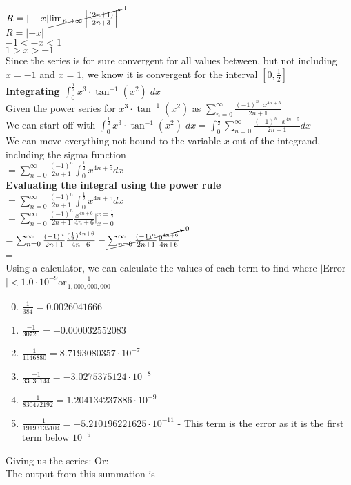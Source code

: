 \documentclass{article}
\begin{document}
\\[0.05in]$R=|-x| \cancelto{1}{\lim_{n\to\infty} \left|\frac{(2n+1)}{2n+3}\right|}$
\\$R=|-x|$
\\$-1<-x<1$
\\$1>x>-1$ 
\\Since the series is for sure convergent for all values between, but not including  $x=-1$ and $x=1$, we know it is convergent for the interval $[0,\frac{1}{2}]$
\\[1in]
\textbf{Integrating $\int_{0}^{\frac{1}{2}}x^3\cdot \tan^{-1}(x^2)\;dx$}
\\Given the power series for $x^3\cdot \tan^{-1}(x^2)$ as $\sum_{n=0}^{\infty}\frac{(-1)^n\cdot x^{4n+5}}{2n+1}$
\\[0.1in]We can start off with $\int_{0}^{\frac{1}{2}}x^3\cdot \tan^{-1}(x^2)\;dx = \int_{0}^{\frac{1}{2}}\sum_{n=0}^{\infty}\frac{(-1)^n\cdot {x^{4n+5}}}{2n+1}dx$
\\[0.1in]We can move everything not bound to the variable $x$ out of the integrand, including the sigma function
\\[0.1in]$= \sum_{n=0}^{\infty}\frac{(-1)^n}{2n+1}\int_{0}^{\frac{1}{2}} x^{4n+5}dx$
\\[0.1in]\textbf{Evaluating the integral using the power rule}
\\[0.05in]$= \sum_{n=0}^{\infty}\frac{(-1)^n}{2n+1}\int_{0}^{\frac{1}{2}} x^{4n+5}dx$
\\[0.05in]$=\sum_{n=0}^{\infty}\frac{(-1)^n}{2n+1}\frac{x^{4n+6}}{4n+6} \bigg|_{x=0}^{x=\frac{1}{2}}$
\\[0.05in]$=\sum_{n=0}^{\infty}\frac{(-1)^n}{2n+1}\frac{(\frac{1}{2})^{4n+6}}{4n+6} -\cancelto{0}{\sum_{n=0}^{\infty}\frac{(-1)^n}{2n+1}\frac{0^{4n+6}}{4n+6}} $
\\[0.05in]=
\\[0.1in]Using a calculator, we can calculate the values of each term to find where $|$Error$| < 1.0\cdot 10^{-9} $or$ \frac{1}{1,000,000,000}$
\begin{enumerate}
    \setcounter{enumi}{-1}
    \item $\frac{1}{384} = 0.0026041666$
    \item $\frac{-1}{30720}=-0.000032552083$
    \item $\frac{1}{1146880}=8.7193080357\cdot 10^{-7}$
    \item $\frac{-1}{33030144} =-3.0275375124\cdot 10^{-8}$
    \item $\frac{1}{830472192} = 1.204134237886 \cdot 10^{-9}$
    \item $\frac{-1}{19193135104} = -5.210196221625\cdot 10^{-11}$ - This term is the error as it is the first term below $10^{-9}$
\end{enumerate}
Giving us the series: 
Or: 
\\[0.1in] The output from this summation is 
\vfill\null\pagebreak
\end{document}
